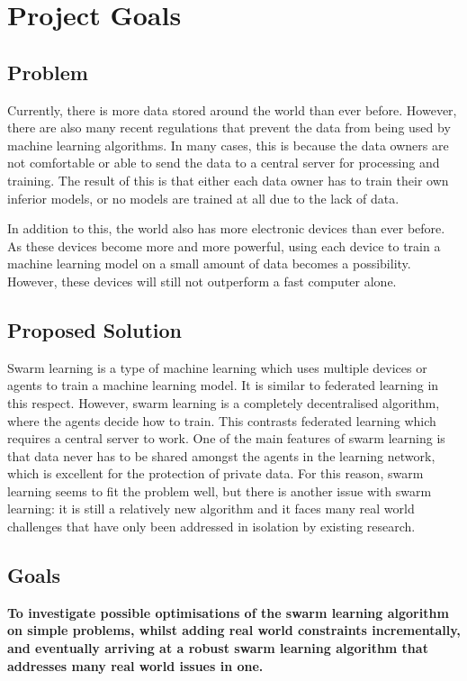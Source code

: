 \chapter{Project Goals}
\section{Problem}
Currently, there is more data stored around the world than ever before. However, there are also many recent regulations that prevent the data from being used by machine learning algorithms. In many cases, this is because the data owners are not comfortable or able to send the data to a central server for processing and training. The result of this is that either each data owner has to train their own inferior models, or no models are trained at all due to the lack of data.

In addition to this, the world also has more electronic devices than ever before. As these devices become more and more powerful, using each device to train a machine learning model on a small amount of data becomes a possibility. However, these devices will still not outperform a fast computer alone.

\section{Proposed Solution}
Swarm learning is a type of machine learning which uses multiple devices or agents to train a machine learning model. It is similar to federated learning in this respect. However, swarm learning is a completely decentralised algorithm, where the agents decide how to train. This contrasts federated learning which requires a central server to work. One of the main features of swarm learning is that data never has to be shared amongst the agents in the learning network, which is excellent for the protection of private data. For this reason, swarm learning seems to fit the problem well, but there is another issue with swarm learning: it is still a relatively new algorithm and it faces many real world challenges that have only been addressed in isolation by existing research.

\section{Goals}
\textbf{To investigate possible optimisations of the swarm learning algorithm on simple problems, whilst adding real world constraints incrementally, and eventually arriving at a robust swarm learning algorithm that addresses many real world issues in one.}

